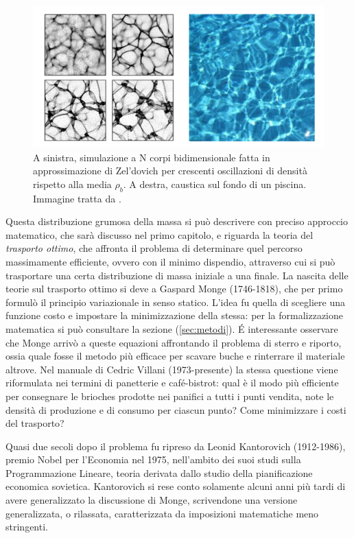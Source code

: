 \begin{center}
	\begin{figure}[H]
		\centering
		\includegraphics[scale=0.25, angle=0]{caustica.png}
        \caption{A sinistra, simulazione a N corpi bidimensionale fatta in approssimazione di Zel'dovich per crescenti
        oscillazioni di densità rispetto alla media $\rho_b$. A destra, caustica sul fondo di un piscina. Immagine tratta da \cite{gurbatov}.}
		\label{fig:caustica}
	\end{figure}
\end{center}
Questa distribuzione grumosa della massa si può descrivere con preciso approccio matematico, che sarà discusso nel primo capitolo,
e riguarda la teoria del \textit{trasporto ottimo}, che affronta il problema di determinare quel percorso massimamente
efficiente, ovvero con il minimo dispendio, attraverso cui si può trasportare una certa distribuzione di massa iniziale a una 
finale. La nascita delle teorie sul trasporto ottimo si deve a Gaspard Monge (1746-1818), che per primo formulò il principio
variazionale in senso statico. L'idea fu quella di scegliere una funzione costo e impostare la minimizzazione della stessa: 
per la formalizzazione matematica si può consultare la sezione (\ref{sec:metodi}). \'E interessante osservare che Monge 
arrivò a queste equazioni affrontando il problema di sterro e riporto, ossia quale fosse il metodo più efficace per scavare buche
e rinterrare il materiale altrove. Nel manuale di Cedric Villani (1973-presente) la stessa questione viene riformulata nei termini
di panetterie e café-bistrot: qual è il modo più efficiente per consegnare le brioches prodotte nei panifici a tutti i punti vendita,
note le densità di produzione e di consumo per ciascun punto? Come minimizzare i costi del trasporto?

Quasi due secoli dopo il problema fu ripreso da Leonid Kantorovich (1912-1986), premio Nobel per l'Economia nel 1975, nell'ambito 
dei suoi studi sulla Programmazione Lineare, teoria derivata dallo studio della pianificazione economica sovietica. Kantorovich si
rese conto solamente alcuni anni più tardi di avere generalizzato la discussione di Monge, scrivendone una versione generalizzata,
o rilassata, caratterizzata da imposizioni matematiche meno stringenti.

